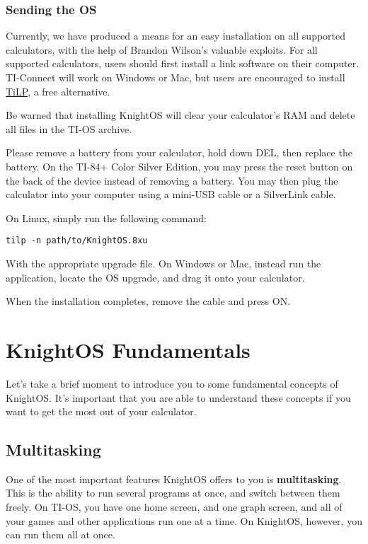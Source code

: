 \subsubsection{Sending the OS}

Currently, we have produced a means for an easy installation on all supported
calculators, with the help of Brandon Wilson's valuable exploits. For all
supported calculators, users should first install a link software on their
computer. TI-Connect will work on Windows or Mac, but users are encouraged to
install \href{http://lpg.ticalc.org/prj_tilp/index.html}{TiLP}, a free
alternative.

Be warned that installing KnightOS will clear your calculator's RAM and delete all
files in the TI-OS archive.

Please remove a battery from your calculator, hold down DEL, then replace the
battery. On the TI-84+ Color Silver Edition, you may press the reset button on the
back of the device instead of removing a battery. You may then plug the calculator
into your computer using a mini-USB cable or a SilverLink cable.

On Linux, simply run the following command:

\begin{verbatim}
tilp -n path/to/KnightOS.8xu
\end{verbatim}

With the appropriate upgrade file. On Windows or Mac, instead run the application,
locate the OS upgrade, and drag it onto your calculator.

When the installation completes, remove the cable and press ON.

\section{KnightOS Fundamentals}

Let's take a brief moment to introduce you to some fundamental concepts of
KnightOS. It's important that you are able to understand these concepts if you
want to get the most out of your calculator.

\subsection{Multitasking}

One of the most important features KnightOS offers to you is
\textbf{multitasking}. This is the ability to run several programs at once, and
switch between them freely. On TI-OS, you have one home screen, and one graph
screen, and all of your games and other applications run one at a time. On
KnightOS, however, you can run them all at once.

